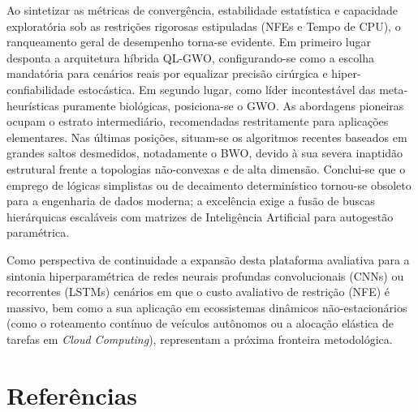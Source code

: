 \documentclass[12pt, a4paper, oneside]{report}
\begin{document}
Ao sintetizar as métricas de convergência, estabilidade estatística e capacidade exploratória sob as restrições rigorosas estipuladas (NFEs e Tempo de CPU), o ranqueamento geral de desempenho torna-se evidente. Em primeiro lugar desponta a arquitetura híbrida QL-GWO, configurando-se como a escolha mandatória para cenários reais por equalizar precisão cirúrgica e hiper-confiabilidade estocástica. Em segundo lugar, como líder incontestável das meta-heurísticas puramente biológicas, posiciona-se o GWO. As abordagens pioneiras ocupam o estrato intermediário, recomendadas restritamente para aplicações elementares. Nas últimas posições, situam-se os algoritmos recentes baseados em grandes saltos desmedidos, notadamente o BWO, devido à sua severa inaptidão estrutural frente a topologias não-convexas e de alta dimensão. Conclui-se que o emprego de lógicas simplistas ou de decaimento determinístico tornou-se obsoleto para a engenharia de dados moderna; a excelência exige a fusão de buscas hierárquicas escaláveis com matrizes de Inteligência Artificial para autogestão paramétrica.

Como perspectiva de continuidade a expansão desta plataforma avaliativa para a sintonia hiperparamétrica de redes neurais profundas convolucionais (CNNs) ou recorrentes (LSTMs) cenários em que o custo avaliativo de restrição (NFE) é massivo, bem como a sua aplicação em ecossistemas dinâmicos não-estacionários (como o roteamento contínuo de veículos autônomos ou a alocação elástica de tarefas em \textit{Cloud Computing}), representam a próxima fronteira metodológica.


\renewcommand{\bibsection}{}
\chapter{Referências} \label{chap:referencias}
\end{document}
